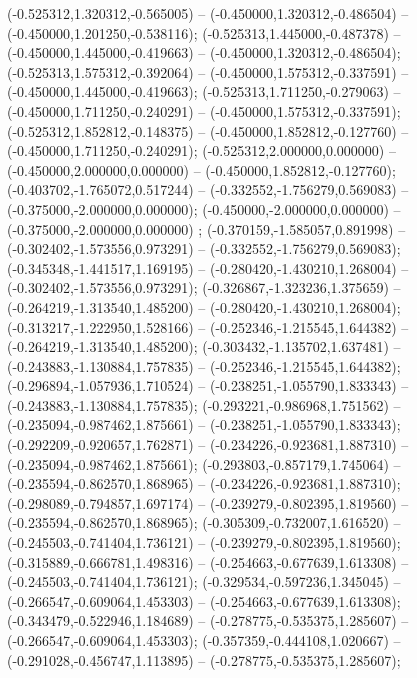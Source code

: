  (-0.525312,1.320312,-0.565005) -- (-0.450000,1.320312,-0.486504) -- (-0.450000,1.201250,-0.538116);
 (-0.525313,1.445000,-0.487378) -- (-0.450000,1.445000,-0.419663) -- (-0.450000,1.320312,-0.486504);
 (-0.525313,1.575312,-0.392064) -- (-0.450000,1.575312,-0.337591) -- (-0.450000,1.445000,-0.419663);
 (-0.525313,1.711250,-0.279063) -- (-0.450000,1.711250,-0.240291) -- (-0.450000,1.575312,-0.337591);
 (-0.525312,1.852812,-0.148375) -- (-0.450000,1.852812,-0.127760) -- (-0.450000,1.711250,-0.240291);
 (-0.525312,2.000000,0.000000) -- (-0.450000,2.000000,0.000000) -- (-0.450000,1.852812,-0.127760);
 (-0.403702,-1.765072,0.517244) -- (-0.332552,-1.756279,0.569083) -- (-0.375000,-2.000000,0.000000);
 (-0.450000,-2.000000,0.000000) -- (-0.375000,-2.000000,0.000000) ;
 (-0.370159,-1.585057,0.891998) -- (-0.302402,-1.573556,0.973291) -- (-0.332552,-1.756279,0.569083);
 (-0.345348,-1.441517,1.169195) -- (-0.280420,-1.430210,1.268004) -- (-0.302402,-1.573556,0.973291);
 (-0.326867,-1.323236,1.375659) -- (-0.264219,-1.313540,1.485200) -- (-0.280420,-1.430210,1.268004);
 (-0.313217,-1.222950,1.528166) -- (-0.252346,-1.215545,1.644382) -- (-0.264219,-1.313540,1.485200);
 (-0.303432,-1.135702,1.637481) -- (-0.243883,-1.130884,1.757835) -- (-0.252346,-1.215545,1.644382);
 (-0.296894,-1.057936,1.710524) -- (-0.238251,-1.055790,1.833343) -- (-0.243883,-1.130884,1.757835);
 (-0.293221,-0.986968,1.751562) -- (-0.235094,-0.987462,1.875661) -- (-0.238251,-1.055790,1.833343);
 (-0.292209,-0.920657,1.762871) -- (-0.234226,-0.923681,1.887310) -- (-0.235094,-0.987462,1.875661);
 (-0.293803,-0.857179,1.745064) -- (-0.235594,-0.862570,1.868965) -- (-0.234226,-0.923681,1.887310);
 (-0.298089,-0.794857,1.697174) -- (-0.239279,-0.802395,1.819560) -- (-0.235594,-0.862570,1.868965);
 (-0.305309,-0.732007,1.616520) -- (-0.245503,-0.741404,1.736121) -- (-0.239279,-0.802395,1.819560);
 (-0.315889,-0.666781,1.498316) -- (-0.254663,-0.677639,1.613308) -- (-0.245503,-0.741404,1.736121);
 (-0.329534,-0.597236,1.345045) -- (-0.266547,-0.609064,1.453303) -- (-0.254663,-0.677639,1.613308);
 (-0.343479,-0.522946,1.184689) -- (-0.278775,-0.535375,1.285607) -- (-0.266547,-0.609064,1.453303);
 (-0.357359,-0.444108,1.020667) -- (-0.291028,-0.456747,1.113895) -- (-0.278775,-0.535375,1.285607);
